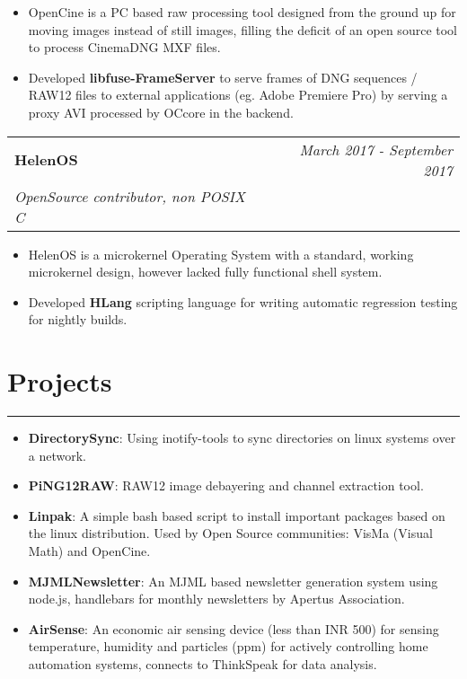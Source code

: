 \documentclass[10pt, a4paper]{article}
\begin{document}
\begin{itemize}
	\itemsep0em
	\item OpenCine is a PC based raw processing tool designed from the ground up for moving images instead of still images, filling the deficit of an open source tool to process CinemaDNG MXF files.
	\item Developed \textbf{libfuse-FrameServer} to serve frames of DNG sequences / RAW12 files to external applications (eg. Adobe Premiere Pro) by serving a proxy AVI processed by OCcore in the backend.
\end{itemize}

\vspace{8px}
\hspace{5px}
\begin{tabularx}{\textwidth}{X r}
	\textbf{HelenOS} & \textit{March 2017 - September 2017} \\
	\textit{\small OpenSource contributor, non POSIX C} & \\
\end{tabularx}

\begin{itemize}
	\itemsep0em
	\item HelenOS is a microkernel Operating System with a standard, working microkernel design, however lacked fully functional shell system.
	\item Developed \textbf{HLang} scripting language for writing automatic regression testing for nightly builds.
\end{itemize}

\section*{Projects}
\vspace{-8px}
\hrule

\hspace{5px}
\begin{itemize}
	\item \textbf{DirectorySync}: Using inotify-tools to sync directories on linux systems over a network.
	\item \textbf{PiNG12RAW}: RAW12 image debayering and channel extraction tool.
	\item \textbf{Linpak}: A simple bash based script to install important packages based on the linux distribution. Used by Open Source communities: VisMa (Visual Math) and OpenCine.
	\item \textbf{MJMLNewsletter}: An MJML based newsletter generation system using node.js, handlebars for monthly newsletters by Apertus Association.
	\item \textbf{AirSense}: An economic air sensing device (less than INR 500) for sensing temperature, humidity and particles (ppm) for actively controlling home automation systems, connects to ThinkSpeak for data analysis.
\end{itemize}
\end{document}
